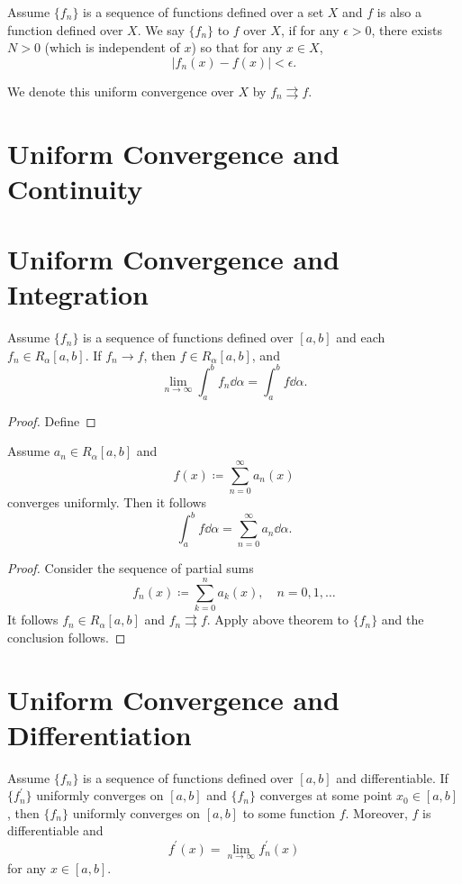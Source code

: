 \begin{definition}
Assume $\{f_n\}$ is a sequence of functions defined over a set $X$ and $f$ is also a function defined over $X$. We say $\{f_n\}$  to $f$ over $X$, if for any $\epsilon>0$, there exists $N>0$ (which is independent of $x$) so that for any $x\in X$,
\[ |f_n(x)-f(x)|<\epsilon. \]
\end{definition}

\begin{notation}
We denote this uniform convergence over $X$ by $f_n\rightrightarrows f$.
\end{notation}

\section{Uniform Convergence and Continuity}

\section{Uniform Convergence and Integration}
\begin{theorem}
Assume $\{f_n\}$ is a sequence of functions defined over $[a,b]$ and each $f_n\in R_\alpha[a,b]$. If $f_n\to f$, then $f\in R_\alpha[a,b]$, and
\[ \lim_{n\to\infty}\int_a^bf_n\dd{\alpha}=\int_a^bf\dd{\alpha}. \]
\end{theorem}

\begin{proof}
Define
\end{proof}

\begin{corollary}
Assume $a_n\in R_\alpha[a,b]$ and
\[ f(x)\coloneqq\sum_{n=0}^\infty a_n(x) \]
converges uniformly. Then it follows
\[ \int_a^bf\dd{\alpha}=\sum_{n=0}^\infty a_n\dd{\alpha}. \]
\end{corollary}

\begin{proof}
Consider the sequence of partial sums 
\[ f_n(x)\coloneqq\sum_{k=0}^na_k(x), \quad n=0,1,\dots \]
It follows $f_n\in R_\alpha[a,b]$ and $f_n\rightrightarrows f$. Apply above theorem to $\{f_n\}$ and the conclusion follows.
\end{proof}

\section{Uniform Convergence and Differentiation}
\begin{theorem}
Assume $\{f_n\}$ is a sequence of functions defined over $[a,b]$ and differentiable. If $\{f_n^\prime\}$ uniformly converges on $[a,b]$ and $\{f_n\}$ converges at some point $x_0\in[a,b]$, then $\{f_n\}$ uniformly converges on $[a,b]$ to some function $f$. Moreover, $f$ is differentiable and
\[ f^\prime(x)=\lim_{n\to\infty}f_n^\prime(x) \]
for any $x\in[a,b]$.
\end{theorem}

